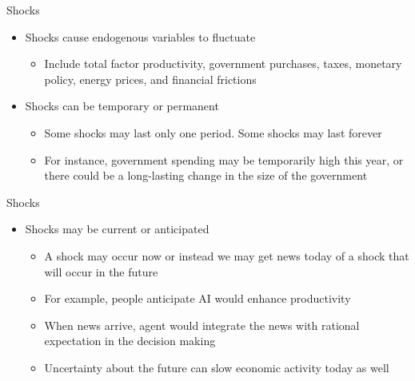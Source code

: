 \documentclass[aspectratio=1610]{beamer}
\begin{document}
\begin{frame}[wide]{Shocks}
	\begin{itemize}
		\item Shocks cause endogenous variables to fluctuate
		\begin{itemize}
			\item Include total factor productivity, government purchases, taxes, monetary policy, energy prices, and financial frictions
		\end{itemize}
		\item Shocks can be temporary or permanent
		\begin{itemize}
			\item Some shocks may last only one period. Some shocks may last forever
			\item For instance, government spending may be temporarily high this year, or there could be a long-lasting change in the size of the government
		\end{itemize}
	\end{itemize}
\end{frame}

\begin{frame}[wide]{Shocks}
	\begin{itemize}
		\item Shocks may be current or anticipated
		\begin{itemize}
			\item A shock may occur now or instead we may get news today of a shock that will occur in the future
			\item For example, people anticipate AI would enhance productivity
			\item When news arrive, agent would integrate the news with rational expectation in the decision making
			\item Uncertainty about the future can slow economic activity today as well
		\end{itemize}
	\end{itemize}
\end{frame}
\end{document}
